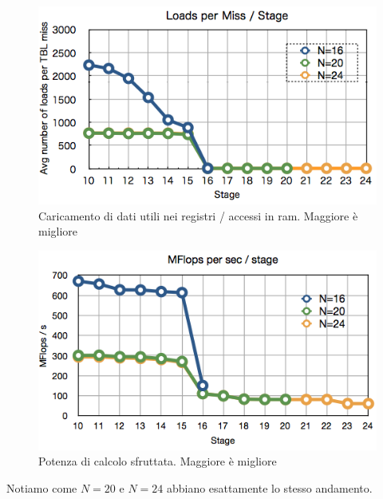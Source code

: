 \documentclass[12pt,a4paper,oneside,openright]{article}
\begin{document}
\begin{figure}[h!]
  \centering
      \includegraphics[width=\textwidth]{immagini/Miss}
  \caption{Caricamento di dati utili nei registri / accessi in ram. Maggiore è migliore}
\label{Miss}
\end{figure}

\begin{figure}[h!] 
  \centering
      \includegraphics[width=\textwidth]{immagini/Mflops}
  \caption{Potenza di calcolo sfruttata. Maggiore è migliore}
\label{MFlops}
\end{figure}
Notiamo come $N=20$ e $N=24$ abbiano esattamente lo stesso andamento.
\end{document}
